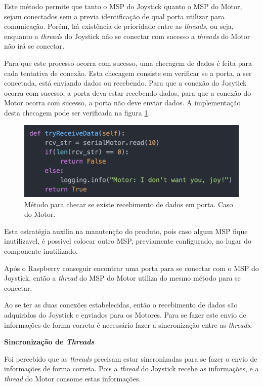   Este método permite que tanto o MSP do Joystick quanto o MSP do Motor, sejam conectados sem a previa identificação de qual porta utilizar para comunicação. Porém, há existência de prioridade entre as \textit{threads}, ou seja, enquanto a \textit{threads} do Joystick não se conectar com sucesso a \textit{threads} do Motor não irá se conectar.

  Para que este processo ocorra com sucesso, uma checagem de dados é feita para cada tentativa de conexão. Esta checagem consiste em verificar se a porta, a ser conectada, está enviando dados ou recebendo. Para que a conexão do Josytick ocorra com sucesso, a porta deva estar recebendo dados, para que a conexão do Motor ocorra com sucesso, a porta não deve enviar dados. A implementação desta checagem pode ser verificada na figura \ref{fig:try_receive_data}.

  \begin{figure}[!htb]
  \centering
  \includegraphics[keepaspectratio=true,scale=0.5]{figuras/resultados/try_receive_data}
  \caption{Método para checar se existe recebimento de dados em porta. Caso do Motor.}
  \label{fig:try_receive_data}
  \end{figure}

  Esta estratégia auxilia na manutenção do produto, pois caso algum MSP fique inutilizavel, é possivel colocar outro MSP, previamente configurado, no lugar do componente inutilizado.

  Após o Raspberry conseguir encontrar uma porta para se conectar com o MSP do Joystick, então a \textit{thread} do MSP do Motor utiliza do mesmo método para se conectar.

  Ao se ter as duas conexões estabelecidas, então o recebimento de dados são adquiridos do Joystick e enviados para os Motores. Para se fazer este envio de informações de forma correta é necessário fazer a sincronização entre as \textit{threads}.

  \textbf{Sincronização de \textit{Threads}}

  Foi percebido que as \textit{threads} precisam estar sincronizadas para se fazer o envio de informações de forma correta. Pois a \textit{thread} do Joystick recebe as informações, e a \textit{thread} do Motor consome estas informações.

